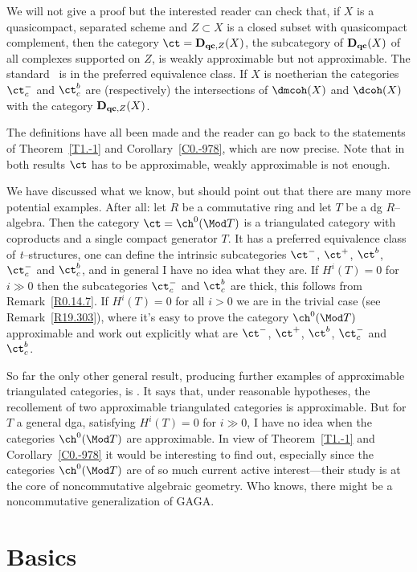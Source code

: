 \documentclass[11pt]{amsart}
\newcommand{\Dqc}{{\mathbf D_{\text{\bf qc}}}}
\begin{document}
We will not give a proof but the interested reader can check
that, if $X$ is a quasicompact, separated scheme and
$Z\subset X$ is a closed subset with
quasicompact complement, then the category 
$\ct={\mathbf D_{\text{\bf qc},Z}}(X)$, the subcategory of
$\Dqc(X)$ of all complexes supported
on $Z$,
is weakly approximable but not approximable. The standard \tstr\
is in the preferred equivalence class. If $X$ is
noetherian the categories $\ct_c^-$
and $\ct_c^b$ are (respectively) the intersections of
$\dmcoh(X)$ and $\dcoh(X)$ with the category 
$\mathbf
  D_{\text{\bf qc},Z}(X)$.
\efac
  

The definitions have all been made and the reader can go back
to the statements of Theorem~\ref{T1.-1}
and Corollary~\ref{C0.-978}, which are now precise.
Note that in both results $\ct$ has to be approximable, weakly
approximable is not enough.

We have discussed what we know, but should point out that there are many
more potential examples. After all: let $R$ be a commutative
ring and let $T$ be a dg $R$--algebra. Then the category
$\ct=\ch^0(\Mod T)$ is a triangulated category with coproducts and
a single
compact generator $T$. It has a preferred equivalence
class of {\it t}--structures, one can define the
intrinsic subcategories $\ct^-$, $\ct^+$, $\ct^b$, $\ct^-_c$ and $\ct^b_c$,
and in general I have no idea what they are. If $H^i(T)=0$ for $i\gg0$ then the
subcategories $\ct^-_c$ and $\ct^b_c$ are thick, this follows
from Remark~\ref{R0.14.7}. If $H^i(T)=0$ for all $i>0$ we are in the trivial
case (see Remark~\ref{R19.303}),
where it's easy to prove the category $\ch^0(\Mod T)$ approximable
and work out explicitly what
are $\ct^-$, $\ct^+$, $\ct^b$, $\ct^-_c$ and $\ct^b_c$.

So far the only other general result, producing further examples
of approximable
triangulated categories, is \cite[Theorem~4.1]{Burke-Neeman-Pauwels18}.
It says that, under reasonable hypotheses, the recollement of two approximable
triangulated categories is approximable. 
But for $T$ a general dga, satisfying $H^i(T)=0$ for $i\gg0$,
I have no idea when the categories
$\ch^0(\Mod T)$ are approximable. In view of
Theorem~\ref{T1.-1} and
Corollary~\ref{C0.-978} it would be interesting to find out, especially
since the categories $\ch^0(\Mod T)$ are of
so much current active interest---their
study is at the core of noncommutative algebraic geometry. Who knows, there
might be a noncommutative generalization of GAGA.


\section{Basics}
\label{S-1}
\end{document}
